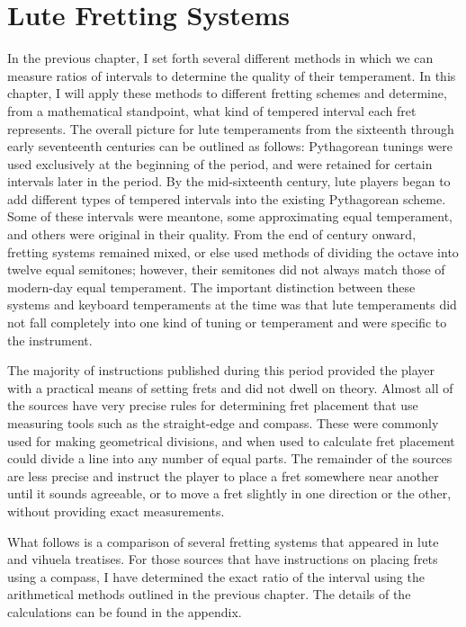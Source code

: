 
\chapter{Lute Fretting Systems}

In the previous chapter, I set forth several different methods in which we can measure
ratios of intervals to determine the quality of their temperament.  In this chapter, I
will apply these methods to different fretting schemes and determine, from a
mathematical standpoint, what kind of tempered interval each fret represents.  The
overall picture for lute temperaments from the sixteenth through early seventeenth
centuries can be outlined as follows: Pythagorean tunings were used exclusively at the
beginning of the period, and were retained for certain intervals later in the
period. By the mid-sixteenth century, lute players began to add different types of
tempered intervals into the existing Pythagorean scheme.  Some of these intervals were
meantone, some approximating equal temperament, and others were original in their
quality.  From the end of century onward, fretting systems remained mixed, or else
used methods of dividing the octave into twelve equal semitones; however, their
semitones did not always match those of modern-day equal temperament. The important
distinction between these systems and keyboard temperaments at the time was
that lute temperaments did not fall completely into one kind of tuning or temperament
and were specific to the instrument.

The majority of instructions published during this period provided the player
with a practical means of setting frets and did not dwell on theory.  Almost all of the
sources have very precise rules for determining fret placement that use measuring tools
such as the straight-edge and compass.  These were commonly used for making
geometrical divisions, and when used to calculate fret placement could
divide a line into any number of equal parts.  The remainder of the sources are less
precise and instruct the player to place a fret somewhere near another until it
sounds agreeable, or to move a fret slightly in one direction or the other, without
providing exact measurements.

What follows is a comparison of several fretting systems that appeared in lute and
vihuela treatises. For those sources that have instructions on placing frets using a
compass, I have determined the exact ratio of the interval using the arithmetical methods 
outlined in the previous chapter.  The details of the calculations can be found in
the appendix.

